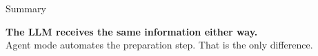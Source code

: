 \documentclass[aspectratio=169,t,10pt]{beamer}
\begin{document}
\begin{frame}{Summary}
\vspace{10pt}
\begin{center}
\textcolor{GNNblue}{\large\bfseries
The LLM receives the same information either way.\\[4pt]}
\textcolor{GNNgray}{\normalsize
Agent mode automates the preparation step. That is the only difference.}
\end{center}

\end{frame}

\end{document}
